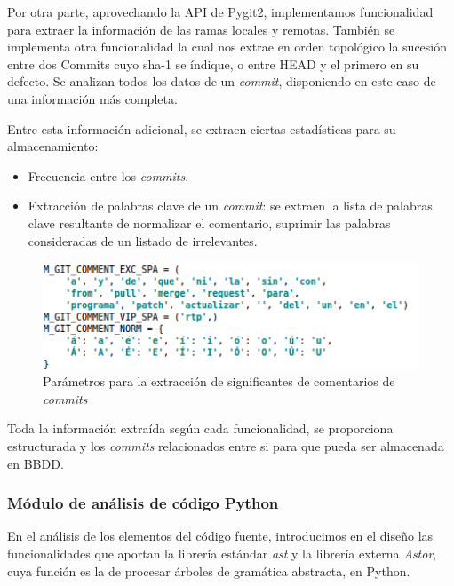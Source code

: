 Por otra parte, aprovechando la API de Pygit2, implementamos funcionalidad para extraer la información de las ramas locales y remotas. También se implementa otra funcionalidad la cual nos extrae en orden topológico la sucesión entre dos Commits cuyo sha-1 se índique, o entre HEAD y el primero en su defecto. Se analizan todos los datos de un \textit{commit}, disponiendo en este caso de una información más completa.


Entre esta información adicional, se extraen ciertas estadísticas para su almacenamiento:

\begin{itemize}
\item Frecuencia entre los \textit{commits}.

\item Extracción de palabras clave de un \textit{commit}: se extraen la lista de palabras clave resultante de normalizar el comentario, suprimir las palabras consideradas de un listado de irrelevantes.
\end{itemize}

\begin{figure}[H]
   \centering
   \includegraphics[width=16cm]{img/Selection_028_git_comentarios}
   \caption{Parámetros para la extracción de significantes de comentarios de \textit{commits}}
   \label{figura:git_commnet}
\end{figure}

Toda la información extraída según cada funcionalidad, se proporciona estructurada y los \textit{commits} relacionados entre si para que pueda ser almacenada en BBDD.


\subsubsection{Módulo de análisis de código Python} 
\label{subsec:mod_anal_python}

En el análisis de los elementos del código fuente, introducimos en el diseño las funcionalidades que aportan la librería estándar \textit{ast} y la librería externa \textit{Astor}, cuya función es la de procesar árboles de gramática abstracta, en Python.


